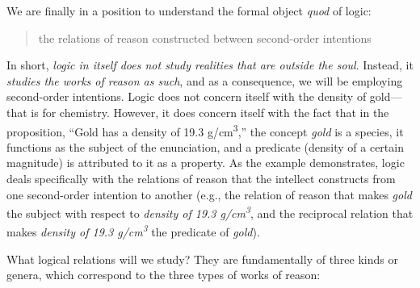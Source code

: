 \documentclass[
  12pt,
]{memoir}
\begin{document}
We are finally in a position to understand the formal object \emph{quod}
of logic:

\begin{quote}
the relations of reason constructed between second-order intentions
\end{quote}

\noindent In short, \emph{logic in itself does not study realities that
are outside the soul}. Instead, it \emph{studies the works of reason as
such}, and as a consequence, we will be employing second-order
intentions. Logic does not concern itself with the density of
gold---that is for chemistry. However, it does concern itself with the
fact that in the proposition, ``Gold has a density of 19.3
g/cm\textsuperscript{3},'' the concept \emph{gold} is a species, it
functions as the subject of the enunciation, and a predicate (density of
a certain magnitude) is attributed to it as a property. As the example
demonstrates, logic deals specifically with the relations of reason that
the intellect constructs from one second-order intention to another
(e.g., the relation of reason that makes \emph{gold} the subject with
respect to \emph{density of 19.3 g/cm\textsuperscript{3}}, and the
reciprocal relation that makes \emph{density of 19.3
g/cm\textsuperscript{3}} the predicate of \emph{gold}).

What logical relations will we study? They are fundamentally of three
kinds or genera, which correspond to the three types of works of reason:
\end{document}
